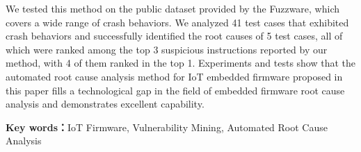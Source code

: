 We tested this method on the public dataset provided by the Fuzzware, which covers a wide range of crash behaviors. We analyzed 41 test cases that exhibited crash behaviors and successfully identified the root causes of 5 test cases, all of which were ranked among the top 3 suspicious instructions reported by our method, with 4 of them ranked in the top 1. Experiments and tests show that the automated root cause analysis method for IoT embedded firmware proposed in this paper fills a technological gap in the field of embedded firmware root cause analysis and demonstrates excellent capability.

\textbf{Key words：}IoT Firmware, Vulnerability Mining, Automated Root Cause Analysis
